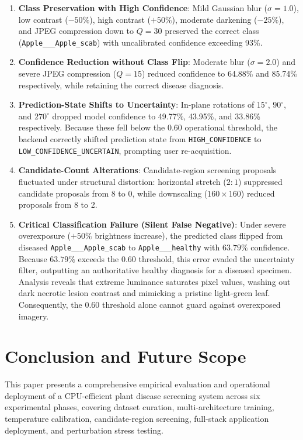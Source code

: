 \documentclass[pdflatex,sn-mathphys-num]{sn-jnl}
\theoremstyle{thmstyleone}%
\theoremstyle{thmstyletwo}%
\theoremstyle{thmstylethree}%
\begin{document}
\begin{enumerate}
  \item \textbf{Class Preservation with High Confidence}: Mild Gaussian blur ($\sigma=1.0$), low contrast ($-50\%$), high contrast ($+50\%$), moderate darkening ($-25\%$), and JPEG compression down to $Q=30$ preserved the correct class (\texttt{Apple\_\_\_Apple\_scab}) with uncalibrated confidence exceeding 93\%.
  \item \textbf{Confidence Reduction without Class Flip}: Moderate blur ($\sigma=2.0$) and severe JPEG compression ($Q=15$) reduced confidence to 64.88\% and 85.74\% respectively, while retaining the correct disease diagnosis.
  \item \textbf{Prediction-State Shifts to Uncertainty}: In-plane rotations of $15^\circ$, $90^\circ$, and $270^\circ$ dropped model confidence to 49.77\%, 43.95\%, and 33.86\% respectively. Because these fell below the 0.60 operational threshold, the backend correctly shifted prediction state from \texttt{HIGH\_CONFIDENCE} to \texttt{LOW\_CONFIDENCE\_UNCERTAIN}, prompting user re-acquisition.
  \item \textbf{Candidate-Count Alterations}: Candidate-region screening proposals fluctuated under structural distortion: horizontal stretch ($2:1$) suppressed candidate proposals from 8 to 0, while downscaling ($160 \times 160$) reduced proposals from 8 to 2.
  \item \textbf{Critical Classification Failure (Silent False Negative)}: Under severe overexposure ($+50\%$ brightness increase), the predicted class flipped from diseased \texttt{Apple\_\_\_Apple\_scab} to \texttt{Apple\_\_\_healthy} with $63.79\%$ confidence. Because $63.79\%$ exceeds the 0.60 threshold, this error evaded the uncertainty filter, outputting an authoritative healthy diagnosis for a diseased specimen. Analysis reveals that extreme luminance saturates pixel values, washing out dark necrotic lesion contrast and mimicking a pristine light-green leaf. Consequently, the 0.60 threshold alone cannot guard against overexposed imagery.
\end{enumerate}

\section{Conclusion and Future Scope}
\label{sec:conclusion}

This paper presents a comprehensive empirical evaluation and operational deployment of a CPU-efficient plant disease screening system across six experimental phases, covering dataset curation, multi-architecture training, temperature calibration, candidate-region screening, full-stack application deployment, and perturbation stress testing.
\end{document}
